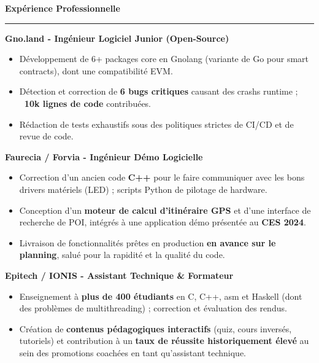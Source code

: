 \documentclass[9pt]{extarticle}
\begin{document}
\par\vspace{5pt}

{\large\bfseries Expérience Professionnelle}
\par\vspace{-8pt}
\rule{\linewidth}{0.4pt}
\par\vspace{5pt}

{\bfseries Gno.land - Ingénieur Logiciel Junior (Open-Source)}
\begin{itemize}[noitemsep, topsep=0pt]
	\item Développement de 6+ packages core en Gnolang (variante de Go pour smart contracts), dont une compatibilité EVM.
	\item Détection et correction de {\bfseries 6 bugs critiques} causant des crashs runtime ; {\bfseries ~10k lignes de code} contribuées.
	\item Rédaction de tests exhaustifs sous des politiques strictes de CI/CD et de revue de code.
\end{itemize}

\par\vspace{5pt}

{\bfseries Faurecia / Forvia - Ingénieur Démo Logicielle}
\begin{itemize}[noitemsep, topsep=0pt]
	\item Correction d'un ancien code {\bfseries C++} pour le faire communiquer avec les bons drivers matériels (LED) ; scripts Python de pilotage de hardware.
	\item Conception d'un {\bfseries moteur de calcul d'itinéraire GPS} et d'une interface de recherche de POI, intégrés à une application démo présentée au {\bfseries CES 2024}.
	\item Livraison de fonctionnalités prêtes en production {\bfseries en avance sur le planning}, salué pour la rapidité et la qualité du code.
\end{itemize}

\par\vspace{5pt}

{\bfseries Epitech / IONIS - Assistant Technique \& Formateur}
\begin{itemize}[noitemsep, topsep=0pt]
	\item Enseignement à {\bfseries plus de 400 étudiants} en C, C++, asm et Haskell (dont des problèmes de multithreading) ; correction et évaluation des rendus.
	\item Création de {\bfseries contenus pédagogiques interactifs} (quiz, cours inversés, tutoriels) et contribution à un {\bfseries taux de réussite historiquement élevé} au sein des promotions coachées en tant qu'assistant technique.
\end{itemize}
\end{document}
